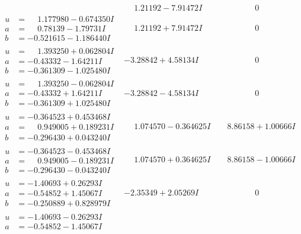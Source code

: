 \documentclass[1p]{elsarticle_modified}
\theoremstyle{definition}
\begin{document}
$$\begin{array}{c|c|c}
 & \phantom{-}1.21192 - 7.91472 I & \phantom{-0.000000 } 0 \\ \hline\begin{aligned}
u &= \phantom{-}1.177980 - 0.674350 I \\
a &= \phantom{-}0.78139 - 1.79731 I \\
b &= -0.521615 - 1.186440 I\end{aligned}
 & \phantom{-}1.21192 + 7.91472 I & \phantom{-0.000000 } 0 \\ \hline\begin{aligned}
u &= \phantom{-}1.393250 + 0.062804 I \\
a &= -0.43332 - 1.64211 I \\
b &= -0.361309 - 1.025480 I\end{aligned}
 & -3.28842 + 4.58134 I & \phantom{-0.000000 } 0 \\ \hline\begin{aligned}
u &= \phantom{-}1.393250 - 0.062804 I \\
a &= -0.43332 + 1.64211 I \\
b &= -0.361309 + 1.025480 I\end{aligned}
 & -3.28842 - 4.58134 I & \phantom{-0.000000 } 0 \\ \hline\begin{aligned}
u &= -0.364523 + 0.453468 I \\
a &= \phantom{-}0.949005 + 0.189231 I \\
b &= -0.296430 + 0.043240 I\end{aligned}
 & \phantom{-}1.074570 - 0.364625 I & \phantom{-}8.86158 + 1.00666 I \\ \hline\begin{aligned}
u &= -0.364523 - 0.453468 I \\
a &= \phantom{-}0.949005 - 0.189231 I \\
b &= -0.296430 - 0.043240 I\end{aligned}
 & \phantom{-}1.074570 + 0.364625 I & \phantom{-}8.86158 - 1.00666 I \\ \hline\begin{aligned}
u &= -1.40693 + 0.26293 I \\
a &= -0.54852 + 1.45067 I \\
b &= -0.250889 + 0.828979 I\end{aligned}
 & -2.35349 + 2.05269 I & \phantom{-0.000000 } 0 \\ \hline\begin{aligned}
u &= -1.40693 - 0.26293 I \\
a &= -0.54852 - 1.45067 I \\

\end{aligned}
\end{array}$$
\end{document}
